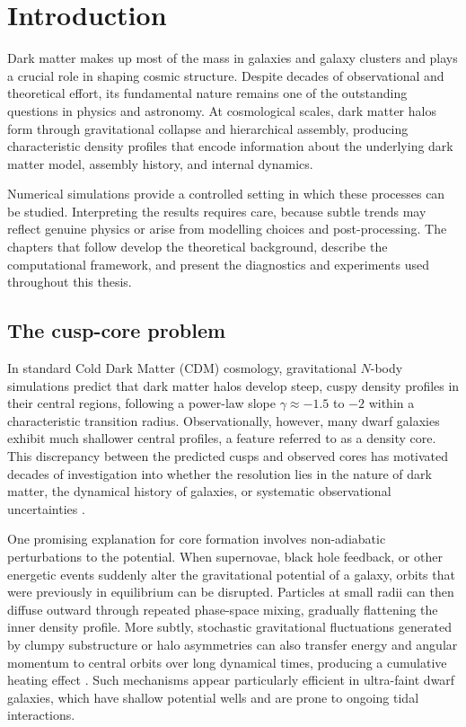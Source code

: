 \cleardoublepage
\chapter{Introduction}

Dark matter makes up most of the mass in galaxies and galaxy clusters and plays a crucial role in shaping cosmic structure. Despite decades of observational and theoretical effort, its fundamental nature remains one of the outstanding questions in physics and astronomy. At cosmological scales, dark matter halos form through gravitational collapse and hierarchical assembly, producing characteristic density profiles that encode information about the underlying dark matter model, assembly history, and internal dynamics.

Numerical simulations provide a controlled setting in which these processes can be studied. Interpreting the results requires care, because subtle trends may reflect genuine physics or arise from modelling choices and post-processing. The chapters that follow develop the theoretical background, describe the computational framework, and present the diagnostics and experiments used throughout this thesis.

\section{The cusp-core problem}

In standard Cold Dark Matter (CDM) cosmology, gravitational $N$-body simulations predict that dark matter halos develop steep, cuspy density profiles in their central regions, following a power-law slope $\gamma \approx -1.5$ to $-2$ within a characteristic transition radius. Observationally, however, many dwarf galaxies exhibit much shallower central profiles, a feature referred to as a density core. This discrepancy between the predicted cusps and observed cores has motivated decades of investigation into whether the resolution lies in the nature of dark matter, the dynamical history of galaxies, or systematic observational uncertainties \citep{power2003inner}.

One promising explanation for core formation involves non-adiabatic perturbations to the potential. When supernovae, black hole feedback, or other energetic events suddenly alter the gravitational potential of a galaxy, orbits that were previously in equilibrium can be disrupted. Particles at small radii can then diffuse outward through repeated phase-space mixing, gradually flattening the inner density profile. More subtly, stochastic gravitational fluctuations generated by clumpy substructure or halo asymmetries can also transfer energy and angular momentum to central orbits over long dynamical times, producing a cumulative heating effect \citep{penarrubia2017fluctuations,penarrubia2019stochastic}. Such mechanisms appear particularly efficient in ultra-faint dwarf galaxies, which have shallow potential wells and are prone to ongoing tidal interactions.


